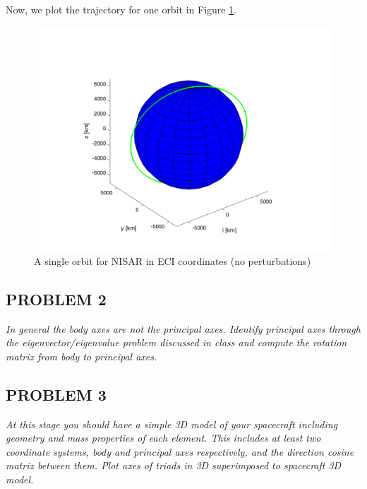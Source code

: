 

Now, we plot the trajectory for one orbit in Figure \ref{fig:simple_propagator}.

\begin{figure}[H]
\centering
\includegraphics[scale=0.75]{Images/ps2_problem1.png}
\caption{A single orbit for NISAR in ECI coordinates (no perturbations)}
\label{fig:simple_propagator}
\end{figure}


\subsection{PROBLEM 2}
\textit{In general the body axes are not the principal axes. Identify principal axes through the eigenvector/eigenvalue problem discussed in class and compute the rotation matrix from body to principal axes.}


\subsection{PROBLEM 3}
\textit{At this stage you should have a simple 3D model of your spacecraft including geometry and mass properties of each element. This includes at least two coordinate systems, body and principal axes respectively, and the direction cosine matrix between them. Plot axes of triads in 3D superimposed to spacecraft 3D model.}

